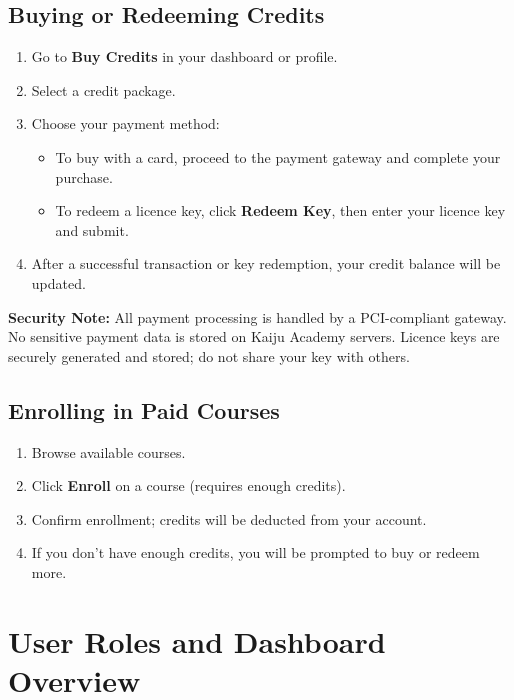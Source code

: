 \documentclass[a4paper,11pt]{scrartcl}
\begin{document}
\subsection{Buying or Redeeming Credits}
\begin{enumerate}[leftmargin=*]
    \item Go to \textbf{Buy Credits} in your dashboard or profile.
    \item Select a credit package.
    \item Choose your payment method:
    \begin{itemize}
        \item To buy with a card, proceed to the payment gateway and complete your purchase.
        \item To redeem a licence key, click \textbf{Redeem Key}, then enter your licence key and submit.
    \end{itemize}
    \item After a successful transaction or key redemption, your credit balance will be updated.
\end{enumerate}
\textbf{Security Note:} All payment processing is handled by a PCI-compliant gateway. No sensitive payment data is stored on Kaiju Academy servers. Licence keys are securely generated and stored; do not share your key with others.

\subsection{Enrolling in Paid Courses}
\begin{enumerate}[leftmargin=*]
    \item Browse available courses.
    \item Click \textbf{Enroll} on a course (requires enough credits).
    \item Confirm enrollment; credits will be deducted from your account.
    \item If you don’t have enough credits, you will be prompted to buy or redeem more.
\end{enumerate}

\section{User Roles and Dashboard Overview}
\end{document}
